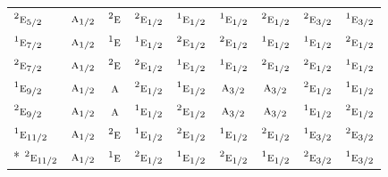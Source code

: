 \documentclass[10pt,a4paper]{article}
\numberwithin{equation}{section}
\newcommand{\irr}[1]{\text{\normalfont\scshape #1}}
\newcommand{\conjpair}[1]{{}^{#1}}
\begin{document}
{\begin{longtable}{@{}lcccccccc@{}}
$\conjpair{2}\irr{e}_{5/2}$ & $\irr{a}_{1/2}$ & $\conjpair{2}\irr{e}$ & $\conjpair{2}\irr{e}_{1/2}$ & $\conjpair{1}\irr{e}_{1/2}$ & $\conjpair{1}\irr{e}_{1/2}$ & $\conjpair{2}\irr{e}_{1/2}$ & $\conjpair{2}\irr{e}_{3/2}$ & $\conjpair{1}\irr{e}_{3/2}$\\
$\conjpair{1}\irr{e}_{7/2}$ & $\irr{a}_{1/2}$ & $\conjpair{1}\irr{e}$ & $\conjpair{1}\irr{e}_{1/2}$ & $\conjpair{2}\irr{e}_{1/2}$ & $\conjpair{2}\irr{e}_{1/2}$ & $\conjpair{1}\irr{e}_{1/2}$ & $\conjpair{1}\irr{e}_{1/2}$ & $\conjpair{2}\irr{e}_{1/2}$\\
$\conjpair{2}\irr{e}_{7/2}$ & $\irr{a}_{1/2}$ & $\conjpair{2}\irr{e}$ & $\conjpair{2}\irr{e}_{1/2}$ & $\conjpair{1}\irr{e}_{1/2}$ & $\conjpair{1}\irr{e}_{1/2}$ & $\conjpair{2}\irr{e}_{1/2}$ & $\conjpair{2}\irr{e}_{1/2}$ & $\conjpair{1}\irr{e}_{1/2}$\\
$\conjpair{1}\irr{e}_{9/2}$ & $\irr{a}_{1/2}$ & $\irr{a}$ & $\conjpair{2}\irr{e}_{1/2}$ & $\conjpair{1}\irr{e}_{1/2}$ & $\irr{a}_{3/2}$ & $\irr{a}_{3/2}$ & $\conjpair{2}\irr{e}_{1/2}$ & $\conjpair{1}\irr{e}_{1/2}$\\
$\conjpair{2}\irr{e}_{9/2}$ & $\irr{a}_{1/2}$ & $\irr{a}$ & $\conjpair{1}\irr{e}_{1/2}$ & $\conjpair{2}\irr{e}_{1/2}$ & $\irr{a}_{3/2}$ & $\irr{a}_{3/2}$ & $\conjpair{1}\irr{e}_{1/2}$ & $\conjpair{2}\irr{e}_{1/2}$\\
$\conjpair{1}\irr{e}_{11/2}$ & $\irr{a}_{1/2}$ & $\conjpair{2}\irr{e}$ & $\conjpair{1}\irr{e}_{1/2}$ & $\conjpair{2}\irr{e}_{1/2}$ & $\conjpair{1}\irr{e}_{1/2}$ & $\conjpair{2}\irr{e}_{1/2}$ & $\conjpair{1}\irr{e}_{3/2}$ & $\conjpair{2}\irr{e}_{3/2}$\\*
$\conjpair{2}\irr{e}_{11/2}$ & $\irr{a}_{1/2}$ & $\conjpair{1}\irr{e}$ & $\conjpair{2}\irr{e}_{1/2}$ & $\conjpair{1}\irr{e}_{1/2}$ & $\conjpair{2}\irr{e}_{1/2}$ & $\conjpair{1}\irr{e}_{1/2}$ & $\conjpair{2}\irr{e}_{3/2}$ & $\conjpair{1}\irr{e}_{3/2}$\\
\bottomrule\end{longtable}}
\end{document}
